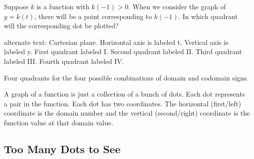 \documentclass{ximera}
\begin{document}
\begin{question}

Suppose $k$ is a function with $k(-1)>0$. When we consider the graph of $y=k(t)$, there will be a point corresponding to $k(-1)$. In which quadrant will the corresponding dot be plotted?
\begin{image}
\end{image}


\textcolor{gray!90}{alternate text: Cartesian plane. Horizontal axis is labeled t. Vertical axis is labeled y. First quadrant labeled I. Second quadrant labeled II. Third quadrant labeled III. Fourth quadrant labeled IV.}


\begin{multipleChoice}
\end{multipleChoice}

\end{question}








Four quadrants for the four possible combinations of domain and codomain signs. 


A graph of a function is just a collection of a bunch of dots.  Each dot represents a pair in the function.  Each dot has two coordinates.  The horizontal (first/left) coordinate is the domain number and the vertical (second/right) coordinate is the function value at that domain value.




\subsection*{Too Many Dots to See}
\end{document}
